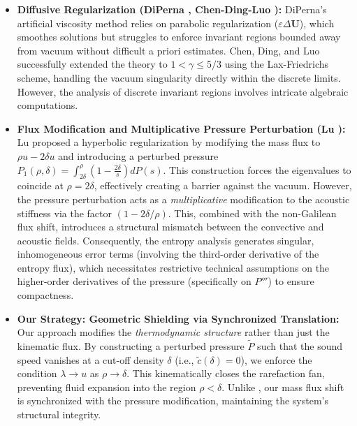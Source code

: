 \documentclass[12pt, reqno]{article}
\theoremstyle{definition}
\numberwithin{equation}{section}
\begin{document}
\begin{itemize}
    \item \textbf{Diffusive Regularization (DiPerna \cite{DiPerna1983}, Chen-Ding-Luo \cite{ChenDingLuo}):}
    DiPerna's artificial viscosity method relies on parabolic regularization ($\varepsilon \Delta \mathbf{U}$), which smoothes solutions but struggles to enforce invariant regions bounded away from vacuum without difficult a priori estimates. Chen, Ding, and Luo successfully extended the theory to $1 < \gamma \le 5/3$ using the Lax-Friedrichs scheme, handling the vacuum singularity directly within the discrete limits. However, the analysis of discrete invariant regions involves intricate algebraic computations.

   \item \textbf{Flux Modification and Multiplicative Pressure Perturbation (Lu \cite{Lu2007}):}
    Lu proposed a hyperbolic regularization by modifying the mass flux to $\rho u - 2\delta u$ and introducing a perturbed pressure $P_1(\rho, \delta) = \int_{2\delta}^\rho (1 - \frac{2\delta}{s}) dP(s)$. This construction forces the eigenvalues to coincide at $\rho = 2\delta$, effectively creating a barrier against the vacuum. However, the pressure perturbation acts as a \textit{multiplicative} modification to the acoustic stiffness via the factor $(1 - 2\delta/\rho)$. This, combined with the non-Galilean flux shift, introduces a structural mismatch between the convective and acoustic fields. Consequently, the entropy analysis generates singular, inhomogeneous error terms (involving the third-order derivative of the entropy flux), which necessitates restrictive technical assumptions on the higher-order derivatives of the pressure (specifically on $P'''$) to ensure compactness.

    \item \textbf{Our Strategy: Geometric Shielding via Synchronized Translation:}
    Our approach modifies the \textit{thermodynamic structure} rather than just the kinematic flux. By constructing a perturbed pressure $\tilde{P}$ such that the sound speed vanishes at a cut-off density $\delta$ (i.e., $\tilde{c}(\delta)=0$), we enforce the condition $\lambda \to u$ as $\rho \to \delta$. This kinematically closes the rarefaction fan, preventing fluid expansion into the region $\rho < \delta$. Unlike \cite{Lu2007}, our mass flux shift is synchronized with the pressure modification, maintaining the system's structural integrity.
\end{itemize}
\end{document}
